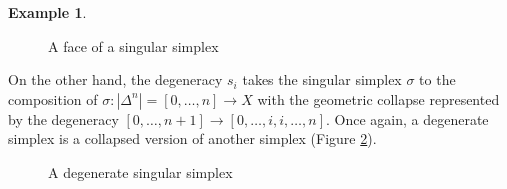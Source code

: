 \documentclass[12pt]{article}
\theoremstyle{plain}
\theoremstyle{definition}
\newtheorem{example}[theorem]{Example}
\begin{document}
\begin{example}
\begin{figure}[!htp]
\begin{center}
\end{center}
\caption{A face of a singular simplex}\label{F: fig11b}
\end{figure}


On the other hand, the degeneracy $s_i$ takes the singular simplex $\sigma$ to the composition of $\sigma\colon|\Delta^n|=[0,\ldots, n]\to X$ with the geometric collapse represented by the degeneracy $[0,\ldots, n+1]\to[0,\ldots, i,i,\ldots,n]$.  Once again, a degenerate simplex is a collapsed version of another simplex (Figure \ref{F: fig11c}). 




\begin{figure}[!htp]
\begin{center}
\end{center}
\caption{A degenerate singular simplex}\label{F: fig11c}
\end{figure}



\end{example}
\end{document}
